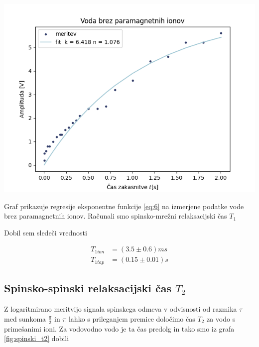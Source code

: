 \documentclass[11pt]{article}
\begin{document}
\begin{slika}[H]
\begin{center}
  \includegraphics[width=.9\linewidth]{figures/t1_tap.png}
  \caption{\small Graf prikazuje regresije eksponentne funkcije \ref{eq:6} na izmerjene podatke vode brez paramagnetnih ionov. Računali smo spinsko-mrežni relaksacijski čas \(  T_{1  } \)}\label{fig:t1_tap}
\end{center}
\end{slika}

Dobil sem sledeči vrednosti

\begin{align*}
  T_{1 ion} &= (3.5 \pm 0.6) ms \\
T_{1 tap} &= (0.15 \pm 0.01) s
\end{align*}

\subsection{Spinsko-spinski relaksacijski čas \(T_2\)}\label{sec:orgefcfe41}
Z logaritmirano meritvijo signala spinskega odmeva v odvisnosti od razmika \(\tau\) med sunkoma \(\frac{\pi}{2}\) in \(\pi\) lahko s prileganjem premice določimo čas \(T_2\) za vodo s primešanimi ioni. Za vodovodno vodo je ta čas predolg in tako smo iz grafa \ref{fig:spinski_t2} dobili
\end{document}
